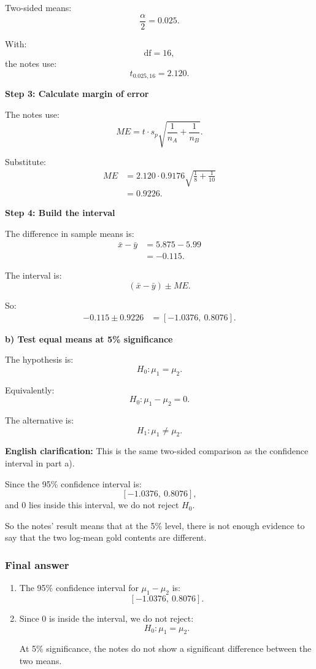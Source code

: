 \documentclass[10pt]{article}
\begin{document}
Two-sided means:
\[
\frac{\alpha}{2}=0.025.
\]

With:
\[
\text{df}=16,
\]
the notes use:
\[
t_{0.025,16}=2.120.
\]

\textbf{Step 3: Calculate margin of error}

The notes use:
\[
ME
=
t\cdot s_p
\sqrt{
\frac{1}{n_A}
+
\frac{1}{n_B}
}.
\]

Substitute:
\begin{align*}
ME
&=
2.120\cdot 0.9176
\sqrt{
\frac{1}{8}
+
\frac{1}{10}
}
\\[2mm]
&=
0.9226.
\end{align*}

\textbf{Step 4: Build the interval}

The difference in sample means is:
\begin{align*}
\bar{x}-\bar{y}
&=
5.875-5.99
\\[2mm]
&=
-0.115.
\end{align*}

The interval is:
\[
(\bar{x}-\bar{y})\pm ME.
\]

So:
\begin{align*}
-0.115\pm 0.9226
&=
[-1.0376,\ 0.8076].
\end{align*}

\textbf{b) Test equal means at 5\% significance}

The hypothesis is:
\[
H_0:\mu_1=\mu_2.
\]

Equivalently:
\[
H_0:\mu_1-\mu_2=0.
\]

The alternative is:
\[
H_1:\mu_1\ne \mu_2.
\]

\textbf{English clarification:}
This is the same two-sided comparison as the
confidence interval in part a).

Since the 95\% confidence interval is:
\[
[-1.0376,\ 0.8076],
\]
and \(0\) lies inside this interval, we do not reject
\(H_0\).

So the notes' result means that at the 5\% level,
there is not enough evidence to say that the two
log-mean gold contents are different.

\subsubsection*{Final answer}

\begin{enumerate}[label=\alph*)]
\item
The 95\% confidence interval for
\(\mu_1-\mu_2\) is:
\[
[-1.0376,\ 0.8076].
\]

\item
Since \(0\) is inside the interval, we do not reject:
\[
H_0:\mu_1=\mu_2.
\]

At 5\% significance, the notes do not show a
significant difference between the two means.
\end{enumerate}
\end{document}
